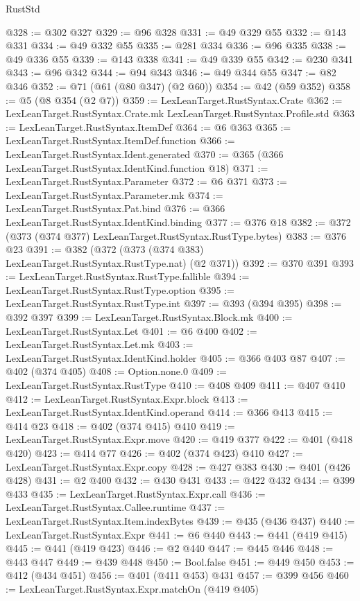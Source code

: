 \begin{lexlean}{RustStd}
\begin{coremodule}
@328 := @302 @327
@329 := @96 @328
@331 := @49 @329 @55
@332 := @143 @331
@334 := @49 @332 @55
@335 := @281 @334
@336 := @96 @335
@338 := @49 @336 @55
@339 := @143 @338
@341 := @49 @339 @55
@342 := @230 @341
@343 := @96 @342
@344 := @94 @343
@346 := @49 @344 @55
@347 := @82 @346
@352 := @71 (@61 (@80 @347) (@2 @60))
@354 := @42 (@59 @352)
@358 := @5 (@8 @354 (@2 @7))
@359 := LexLeanTarget.RustSyntax.Crate
@362 := LexLeanTarget.RustSyntax.Crate.mk LexLeanTarget.RustSyntax.Profile.std
@363 := LexLeanTarget.RustSyntax.ItemDef
@364 := @6 @363
@365 := LexLeanTarget.RustSyntax.ItemDef.function
@366 := LexLeanTarget.RustSyntax.Ident.generated
@370 := @365 (@366 LexLeanTarget.RustSyntax.IdentKind.function @18)
@371 := LexLeanTarget.RustSyntax.Parameter
@372 := @6 @371
@373 := LexLeanTarget.RustSyntax.Parameter.mk
@374 := LexLeanTarget.RustSyntax.Pat.bind
@376 := @366 LexLeanTarget.RustSyntax.IdentKind.binding
@377 := @376 @18
@382 := @372 (@373 (@374 @377) LexLeanTarget.RustSyntax.RustType.bytes)
@383 := @376 @23
@391 := @382 (@372 (@373 (@374 @383) LexLeanTarget.RustSyntax.RustType.nat) (@2 @371))
@392 := @370 @391
@393 := LexLeanTarget.RustSyntax.RustType.fallible
@394 := LexLeanTarget.RustSyntax.RustType.option
@395 := LexLeanTarget.RustSyntax.RustType.int
@397 := @393 (@394 @395)
@398 := @392 @397
@399 := LexLeanTarget.RustSyntax.Block.mk
@400 := LexLeanTarget.RustSyntax.Let
@401 := @6 @400
@402 := LexLeanTarget.RustSyntax.Let.mk
@403 := LexLeanTarget.RustSyntax.IdentKind.holder
@405 := @366 @403 @87
@407 := @402 (@374 @405)
@408 := Option.none.{0}
@409 := LexLeanTarget.RustSyntax.RustType
@410 := @408 @409
@411 := @407 @410
@412 := LexLeanTarget.RustSyntax.Expr.block
@413 := LexLeanTarget.RustSyntax.IdentKind.operand
@414 := @366 @413
@415 := @414 @23
@418 := @402 (@374 @415) @410
@419 := LexLeanTarget.RustSyntax.Expr.move
@420 := @419 @377
@422 := @401 (@418 @420)
@423 := @414 @77
@426 := @402 (@374 @423) @410
@427 := LexLeanTarget.RustSyntax.Expr.copy
@428 := @427 @383
@430 := @401 (@426 @428)
@431 := @2 @400
@432 := @430 @431
@433 := @422 @432
@434 := @399 @433
@435 := LexLeanTarget.RustSyntax.Expr.call
@436 := LexLeanTarget.RustSyntax.Callee.runtime
@437 := LexLeanTarget.RustSyntax.Item.indexBytes
@439 := @435 (@436 @437)
@440 := LexLeanTarget.RustSyntax.Expr
@441 := @6 @440
@443 := @441 (@419 @415)
@445 := @441 (@419 @423)
@446 := @2 @440
@447 := @445 @446
@448 := @443 @447
@449 := @439 @448
@450 := Bool.false
@451 := @449 @450
@453 := @412 (@434 @451)
@456 := @401 (@411 @453) @431
@457 := @399 @456
@460 := LexLeanTarget.RustSyntax.Expr.matchOn (@419 @405)

\end{coremodule}
\end{lexlean}
